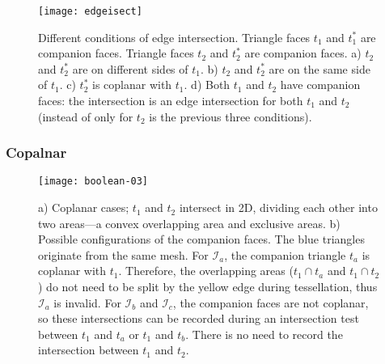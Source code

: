 \begin{figure}[t]
\centering
\texttt{[image: edgeisect]}
\caption{Different conditions of edge intersection. Triangle faces $t_1$ and $t_1^*$ are companion faces. Triangle faces $t_2$ and $t_2^*$ are companion faces. a) $t_2$ and $t_2^*$ are on different sides of $t_1$. b) $t_2$ and $t_2^*$ are on the same side of $t_1$. c) $t_2^*$ is coplanar with $t_1$. d) Both $t_1$ and $t_2$ have companion faces: the intersection is an edge intersection for both $t_1$ and $t_2$ (instead of only for $t_2$ is the previous three conditions). }
\label{fig:twin}
\end{figure}


\subsubsection{Copalnar}

\begin{figure}[t]
\centering
\texttt{[image: boolean-03]}
\caption{a) Coplanar cases; $t_1$ and $t_2$ intersect in 2D, dividing each other into two areas---a convex overlapping area and exclusive areas. b) Possible configurations of the companion faces. The blue triangles originate from the same mesh. For $\mathcal{I}_a$, the companion triangle $t_a$ is coplanar with $t_1$. Therefore, the overlapping areas ($t_1 \cap t_a$ and $t_1 \cap t_2$) do not need to be split by the yellow edge during tessellation, thus $\mathcal{I}_a$ is invalid. For $\mathcal{I}_b$ and $\mathcal{I}_c$, the companion faces are not coplanar, so these intersections can be recorded during an intersection test between $t_1$ and $t_a$ or $t_1$ and $t_b$. There is no need to record the intersection between $t_1$ and $t_2$.}
\label{fig:coplanar}
\end{figure}


